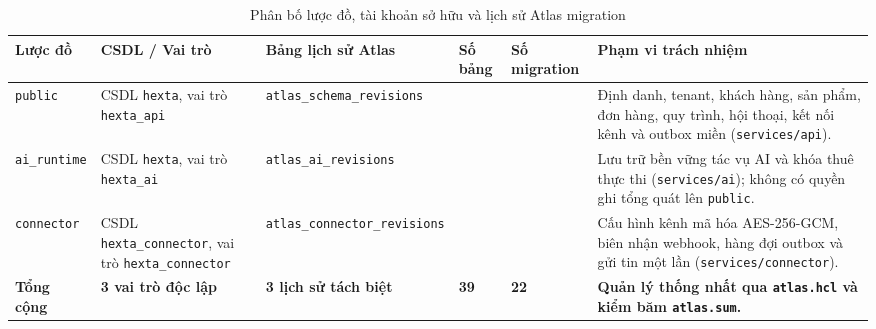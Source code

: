 \begin{table}[htbp]
  \centering
  \small
  \setlength{\tabcolsep}{4pt}
  \renewcommand{\arraystretch}{1.15}
  \caption{Phân bố lược đồ, tài khoản sở hữu và lịch sử Atlas migration}\label{tab:app-schema-overview}
  \begin{tabularx}{\linewidth}{@{}
    >{\raggedright\arraybackslash}p{2.2cm}
    >{\raggedright\arraybackslash}p{2.9cm}
    >{\raggedright\arraybackslash}p{2.6cm}
    >{\raggedright\arraybackslash}p{1.2cm}
    >{\raggedright\arraybackslash}p{1.5cm}
    >{\raggedright\arraybackslash}X@{}}
    \toprule
    Lược đồ & CSDL / Vai trò & Bảng lịch sử Atlas & Số bảng & Số migration & Phạm vi trách nhiệm \\
    \midrule
    \texttt{public} &
    CSDL \texttt{hexta}, vai trò \texttt{hexta\_\hspace{0pt}api} &
    \texttt{atlas\_\hspace{0pt}schema\_\hspace{0pt}revisions} &
    31 &
    17 &
    Định danh, tenant, khách hàng, sản phẩm, đơn hàng, quy trình, hội thoại, kết nối kênh và outbox miền (\texttt{services/\hspace{0pt}api}). \\
    \texttt{ai\_\hspace{0pt}runtime} &
    CSDL \texttt{hexta}, vai trò \texttt{hexta\_\hspace{0pt}ai} &
    \texttt{atlas\_\hspace{0pt}ai\_\hspace{0pt}revisions} &
    1 &
    1 &
    Lưu trữ bền vững tác vụ AI và khóa thuê thực thi (\texttt{services/\hspace{0pt}ai}); không có quyền ghi tổng quát lên \texttt{public}. \\
    \texttt{connector} &
    CSDL \texttt{hexta\_\hspace{0pt}connector}, vai trò \texttt{hexta\_\hspace{0pt}connector} &
    \texttt{atlas\_\hspace{0pt}connector\_\hspace{0pt}revisions} &
    7 &
    4 &
    Cấu hình kênh mã hóa AES-256-GCM, biên nhận webhook, hàng đợi outbox và gửi tin một lần (\texttt{services/\hspace{0pt}connector}). \\
    \midrule
    \textbf{Tổng cộng} & \textbf{3 vai trò độc lập} & \textbf{3 lịch sử tách biệt} & \textbf{39} & \textbf{22} & \textbf{Quản lý thống nhất qua \texttt{atlas.hcl} và kiểm băm \texttt{atlas.sum}.} \\
    \bottomrule
  \end{tabularx}
\end{table}


